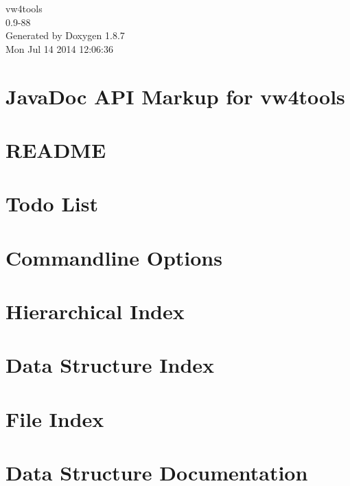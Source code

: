 \documentclass[twoside]{book}
\newcommand{\+}{\discretionary{\mbox{\scriptsize$\hookleftarrow$}}{}{}}
\newcommand{\clearemptydoublepage}{%
  \newpage{\pagestyle{empty}\cleardoublepage}%
}
\begin{document}
\begin{titlepage}
\vspace*{7cm}
\begin{center}%
{\Large vw4tools \\[1ex]\large 0.\+9-\/88 }\\
\vspace*{1cm}
{\large Generated by Doxygen 1.8.7}\\
\vspace*{0.5cm}
{\small Mon Jul 14 2014 12:06:36}\\
\end{center}
\end{titlepage}
\clearemptydoublepage
\tableofcontents
\clearemptydoublepage
{}

\chapter{Java\+Doc A\+P\+I Markup for vw4tools}
\label{index}
\chapter{R\+E\+A\+D\+M\+E}
\label{md_htdocs_README}

\chapter{Todo List}
\label{todo}

\chapter{Commandline Options}
\label{cmdopt}

\chapter{Hierarchical Index}

\chapter{Data Structure Index}

\chapter{File Index}

\chapter{Data Structure Documentation}









\end{document}
